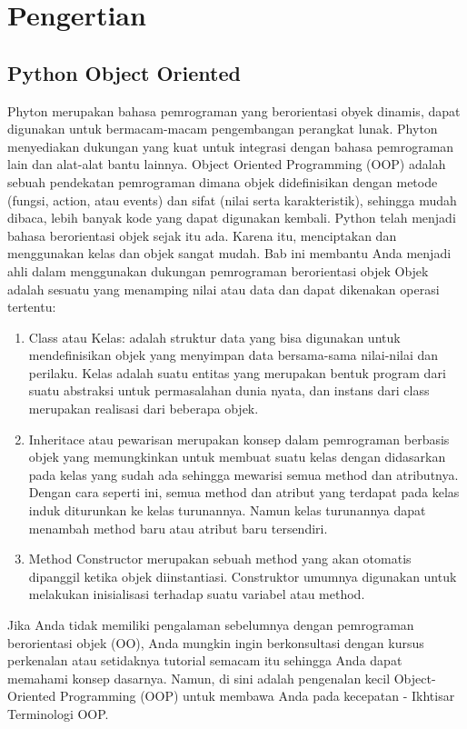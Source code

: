 \section{Pengertian }
\subsection{Python Object Oriented}
Phyton merupakan bahasa pemrograman yang berorientasi obyek dinamis, dapat digunakan untuk bermacam-macam pengembangan perangkat lunak. Phyton menyediakan dukungan yang kuat untuk integrasi dengan bahasa pemrograman lain dan alat-alat bantu lainnya.
Object Oriented Programming (OOP) adalah sebuah pendekatan pemrograman dimana objek didefinisikan dengan metode (fungsi, action, atau events) dan sifat (nilai serta karakteristik), sehingga mudah dibaca, lebih banyak kode yang dapat digunakan kembali.
Python telah menjadi bahasa berorientasi objek sejak itu ada. Karena itu, menciptakan dan menggunakan kelas dan objek sangat mudah. Bab ini membantu Anda menjadi ahli dalam menggunakan dukungan pemrograman berorientasi objek
Objek adalah sesuatu yang menamping nilai atau data dan dapat dikenakan operasi tertentu:
\begin {enumerate}
\item Class atau Kelas: adalah struktur data yang bisa digunakan untuk mendefinisikan objek yang menyimpan data bersama-sama nilai-nilai dan perilaku. Kelas adalah suatu entitas yang merupakan bentuk program dari suatu abstraksi untuk permasalahan dunia nyata, dan instans dari class merupakan realisasi dari beberapa objek.
\item Inheritace atau pewarisan merupakan konsep dalam pemrograman berbasis objek yang memungkinkan untuk membuat suatu kelas dengan didasarkan pada kelas yang sudah ada sehingga mewarisi semua method dan atributnya. Dengan cara seperti ini, semua method dan atribut yang terdapat pada kelas induk diturunkan ke kelas turunannya. Namun kelas turunannya dapat menambah method baru atau atribut baru tersendiri.
\item Method Constructor merupakan sebuah method yang akan otomatis dipanggil ketika objek diinstantiasi. Construktor umumnya digunakan untuk melakukan inisialisasi terhadap suatu variabel atau method.
\end {enumerate}
Jika Anda tidak memiliki pengalaman sebelumnya dengan pemrograman berorientasi objek (OO), Anda mungkin  ingin berkonsultasi dengan kursus perkenalan atau setidaknya tutorial semacam itu sehingga Anda dapat memahami konsep dasarnya. Namun, di sini adalah pengenalan kecil Object-Oriented Programming (OOP) untuk membawa Anda pada kecepatan - Ikhtisar Terminologi OOP.


